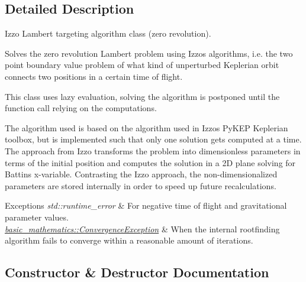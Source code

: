 \subsection{Detailed Description}
Izzo Lambert targeting algorithm class (zero revolution). 

Solves the zero revolution Lambert problem using Izzo\textquotesingle{}s algorithms, i.\+e. the two point boundary value problem of what kind of unperturbed Keplerian orbit connects two positions in a certain time of flight.

This class uses lazy evaluation, solving the algorithm is postponed until the function call relying on the computations.

The algorithm used is based on the algorithm used in Izzo\textquotesingle{}s Py\+K\+EP Keplerian toolbox, but is implemented such that only one solution gets computed at a time. The approach from Izzo transforms the problem into dimensionless parameters in terms of the initial position and computes the solution in a 2D plane solving for Battin\textquotesingle{}s x-\/variable. Contrasting the Izzo approach, the non-\/dimensionalized parameters are stored internally in order to speed up future recalculations.


\begin{DoxyExceptions}{Exceptions}
{\em std\+::runtime\+\_\+error} & For negative time of flight and gravitational parameter values. \\
\hline
{\em \hyperlink{structtudat_1_1basic__mathematics_1_1ConvergenceException}{basic\+\_\+mathematics\+::\+Convergence\+Exception}} & When the internal rootfinding algorithm fails to converge within a reasonable amount of iterations. \\
\hline
\end{DoxyExceptions}


\subsection{Constructor \& Destructor Documentation}

